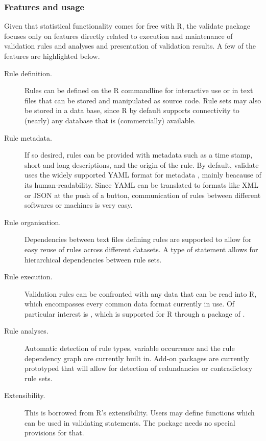 \subsubsection{Features and usage}
Given that statistical functionality comes for free with R, the validate
package focuses only on features directly related to execution and maintenance
of validation rules and  analyses and presentation of validation results.
A few of the features are highlighted below.

\begin{description}
\item[Rule definition.] Rules can be defined on the R commandline for interactive
use or in text files that can be stored and manipulated as source code. Rule sets
may also be stored in a data base, since R by default supports connectivity to 
(nearly) any database that is (commercially) available.

\item[Rule metadata.] If so desired, rules can be provided with metadata such as
a time stamp, short and long descriptions, and the origin of the rule.  By
default, validate uses the widely supported YAML format for metadata
\citep{ben:2009}, mainly beacause of its human-readability. Since YAML can be
translated to formats like XML or JSON at the push of a button, communication
of rules between different softwares or machines is very easy.

\item[Rule organisation.] Dependencies between text files defining rules are
supported to allow for easy reuse of rules across different datasets.  A type
of  statement allows for hierarchical dependencies between rule
sets.

\item[Rule execution.] Validation rules can be confronted with any data that can
be read into R, which encompasses every common data format currently in use.
Of particular interest is , which is supported for R through a
package of \cite{bondel:2015}.

\item[Rule analyses.] Automatic detection of rule types, variable occurrence and
the rule dependency graph are currently built in. Add-on packages are currently
prototyped that will allow for detection of redundancies or contradictory rule
sets.

\item[Extensibility.] This is borrowed from R's extensibility. Users may define
functions which can be used in validating statements. The package needs no special
provisions for that.


\end{description}

